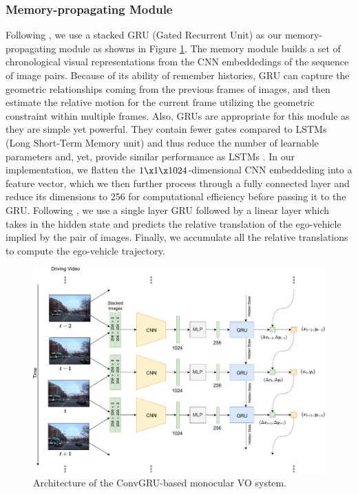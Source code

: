\documentclass[letterpaper, 12pt]{book}
\theoremstyle{definition}
\theoremstyle{definition}
\theoremstyle{definition}
\theoremstyle{definition}
\theoremstyle{definition}
\begin{document}
\subsubsection{Memory-propagating Module}
\label{sec:orgcb36dfe}
Following \cite{Zhai2019}, we use a stacked GRU (Gated Recurrent Unit)
\cite{Ballas2015} as our memory-propagating module as showns in Figure \ref{fig:orgbc5a339}. The
memory module builds a set of chronological visual representations from the CNN
embeddedings of the sequence of image pairs. Because of its ability of remember
histories, GRU can capture the geometric relationships coming from the previous
frames of images, and then estimate the relative motion for the current frame
utilizing the geometric constraint within multiple frames. Also, GRUs are
appropriate for this module as they are simple yet powerful. They contain fewer
gates compared to LSTMs (Long Short-Term Memory unit) and thus reduce the number
of learnable parameters and, yet, provide similar performance as LSTMs
\cite{Chung2014}. In our implementation, we flatten the \(1 \x 1 \x
1024\)-dimensional CNN embeddeding into a feature vector, which we then further
process through a fully connected layer and reduce its dimensions to 256 for
computational efficiency before passing it to the GRU. Following
\cite{Filos2020}, we use a single layer GRU followed by a linear layer which
takes in the hidden state and predicts the relative translation of the
ego-vehicle implied by the pair of images. Finally, we accumulate all the
relative translations to compute the ego-vehicle trajectory.

\begin{figure}[H]
\centering
\includegraphics[keepaspectratio,width=\textwidth,height=\textheight]{./img/deepvo.pdf}
\caption{\label{fig:orgbc5a339}Architecture of the ConvGRU-based monocular VO system.}
\end{figure}
\end{document}

